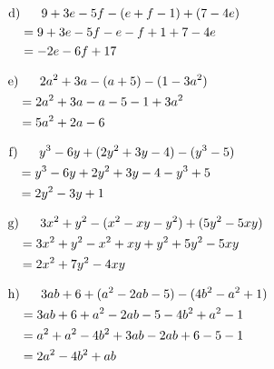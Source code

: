\begin{exercise}
\begin{minipage}[t]{0.49\textwidth}
      \begin{equation*}
        \begin{split}
          \text{d)} &\toprow{9+3e-5f-(e+f-1)+(7-4e)} \\
                    &=     9+3e-5f-e-f+1+7-4e        \\
                    &=     -2e-6f+17
        \end{split}
      \end{equation*}
    \end{minipage}%
    \hfill
    \begin{minipage}[t]{0.49\textwidth}
      \small
      \begin{equation*}
        \begin{split}
          \text{e)} &\toprow{2a^2+3a-(a+5)-(1-3a^2)} \\
                    &=     2a^2+3a-a-5-1+3a^2        \\
                    &=     5a^2+2a-6
        \end{split}
      \end{equation*}

      \begin{equation*}
        \begin{split}
          \text{f)} &\toprow{y^3-6y+(2y^2+3y-4)-(y^3-5)} \\
                    &=       y^3-6y+2y^2+3y-4-y^3+5      \\
                    &=       2y^2-3y+1
        \end{split}
      \end{equation*}

      \begin{equation*}
        \begin{split}
          \text{g)} &\toprow{3x^2+y^2-(x^2-xy-y^2)+(5y^2-5xy)} \\
                    &=       3x^2+y^2-x^2+xy+y^2+5y^2-5xy      \\
                    &=       2x^2+7y^2-4xy
        \end{split}
      \end{equation*}

      \begin{equation*}
        \begin{split}
          \text{h)} &\toprow{3ab+6+(a^2-2ab-5)-(4b^2-a^2+1)} \\
                    &=       3ab+6+a^2-2ab-5-4b^2+a^2-1      \\
                    &=       a^2+a^2-4b^2+3ab-2ab+6-5-1      \\
                    &=       2a^2-4b^2+ab
        \end{split}
      \end{equation*}
    \end{minipage}
  \fi
\end{exercise}
